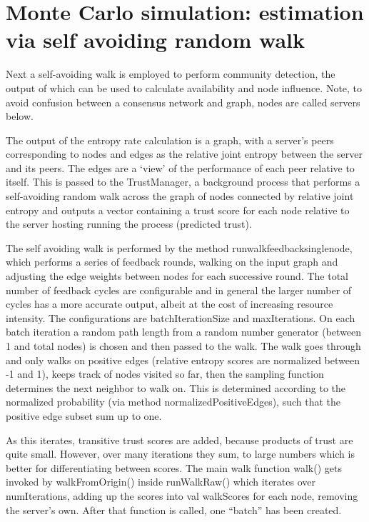 \documentclass{article}
\begin{document}
\section{Monte Carlo simulation: estimation via self avoiding random walk}
Next a self-avoiding walk is employed to perform community detection, the output of which can be used to calculate availability and node influence. Note, to avoid confusion between a consensus network and graph, nodes are called servers below.

The output of the entropy rate calculation is a graph, with a server’s peers corresponding to nodes and edges as the relative joint entropy between the server and its peers. The edges are a ‘view’ of the performance of each peer relative to itself. This is passed to the TrustManager, a background process that performs a self-avoiding random walk across the graph of nodes connected by relative joint entropy and outputs a vector containing a trust score for each node relative to the server hosting running the process (predicted trust).

The self avoiding walk is performed by the method runwalkfeedbacksinglenode, which performs a series of feedback rounds, walking on the input graph and adjusting the edge weights between nodes for each successive round. The total number of feedback cycles are configurable and in general the larger number of cycles has a more accurate output, albeit at the cost of increasing resource intensity. The configurations are batchIterationSize and maxIterations. On each batch iteration a random path length from a random number generator (between 1 and total nodes) is chosen and then passed to the walk. The walk goes through and only walks on positive edges (relative entropy scores are normalized between -1 and 1), keeps track of nodes visited so far, then the sampling function determines the next neighbor to walk on. This is determined according to the normalized probability (via method normalizedPositiveEdges), such that the positive edge subset sum up to one.

As this iterates, transitive trust scores are added, because products of trust are quite small. However, over many iterations they sum, to large numbers which is better for differentiating between scores. The main walk function walk() gets invoked by walkFromOrigin() inside runWalkRaw() which iterates over numIterations, adding up the scores into val walkScores for each node, removing the server’s own. After that function is called, one “batch” has been created. 
\end{document}
